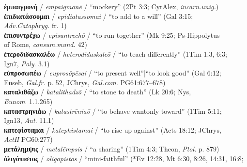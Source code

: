 \begin{small}
\noindent{}\textbf{ἐμπαιγμονή} / \textit{empaigmonē} / “mockery” (2Pt 3:3; CyrAlex, \textit{incarn.unig.}) \\ %
\noindent{}\textbf{ἐπιδιατάσσομαι} / \textit{epidiatassomai} / “to add to a will” (Gal 3:15; \\\makebox[3em][l]{}\textit{Adv.Cataphryg.} fr. 1) \\[0.4mm] %
 \noindent{}\textbf{ἐπισυντρέχω} / \textit{episuntrechō} / “to run together” (Mk 9:25; Ps-Hippolytus \\\makebox[3em][l]{}of Rome, \textit{consum.mund.} 42) \\ %
\noindent{}\textbf{ἑτεροδιδασκαλέω} / \textit{heterodidaskaleō} / “to teach differently” (1Tim 1:3, 6:3; \\\makebox[3em][l]{}Ign7, \textit{Poly}. 3.1) \\[0.4mm] %
\noindent{}\textbf{εὐπροσωπέω} / \textit{euprosōpēsai} / “to present well”|“to look good” (Gal 6:12; \\\makebox[3em][l]{}Euseb, \textit{Gal.fr.} p. 52, JChrys, \textit{Gal.com.} PG61:677--678) \\[0.4mm] %
\noindent{}\textbf{καταλιθάζω} / \textit{katalithadzō} / “to stone to death” (Lk 20:6; Nys, \\\makebox[3em][l]{}\textit{Eunom}. 1.1.265) \\[0.4mm] %
\noindent{}\textbf{καταστρηνιάω} / \textit{katastrēniaō} / “to behave wantonly toward” (1Tim 5:11; \\\makebox[3em][l]{}Ign13, \textit{Ant}. 11.1) \\[0.4mm] %
\noindent{}\textbf{κατεφίσταμαι} / \textit{katephistamai} / “to rise up against” (Acts 18:12; JChrys, \\\makebox[3em][l]{}\textit{ActH} PG60:277) \\[0.4mm] %
\noindent{}\textbf{μετάλημψις} / \textit{metalēmpsis} / “a sharing” (1Tim 4:3; Theon, \textit{Ptol}. p. 879) \\[0.4mm] %
 \noindent{}\textbf{ὀλιγόπιστος} / \textit{oligopistos} / “mini-faithful” (*Ev 12:28, Mt 6:30, 8:26, 14:31, 16:8; %

\end{small}
